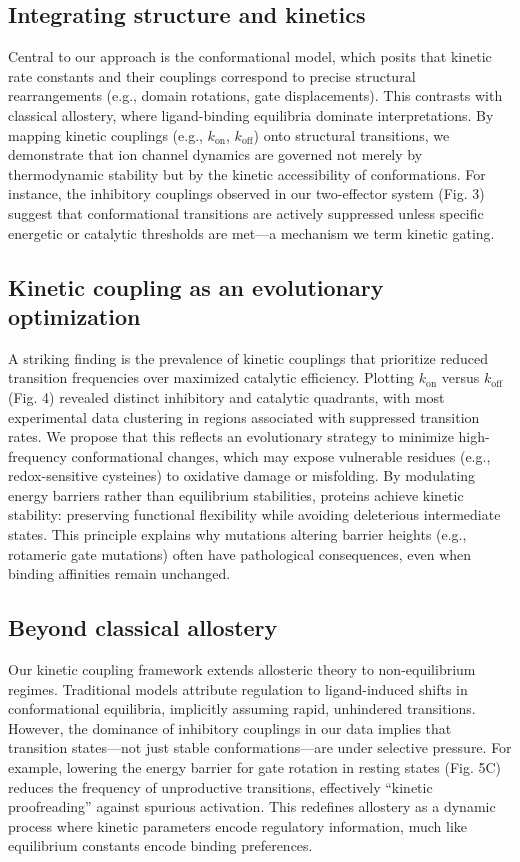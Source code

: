 \documentclass[pdflatex,sn-mathphys-num]{sn-jnl}%
\theoremstyle{thmstyleone}%
\theoremstyle{thmstyletwo}%
\theoremstyle{thmstylethree}%
\begin{document}
\subsection{Integrating structure and kinetics}  
Central to our approach is the conformational model, which posits that kinetic rate constants and their couplings correspond to precise structural rearrangements (e.g., domain rotations, gate displacements). This contrasts with classical allostery, where ligand-binding equilibria dominate interpretations. By mapping kinetic couplings (e.g., \( k_{\text{on}} \), \( k_{\text{off}} \)) onto structural transitions, we demonstrate that ion channel dynamics are governed not merely by thermodynamic stability but by the kinetic accessibility of conformations. For instance, the inhibitory couplings observed in our two-effector system (Fig. 3) suggest that conformational transitions are actively suppressed unless specific energetic or catalytic thresholds are met—a mechanism we term kinetic gating.  


\subsection{Kinetic coupling as an evolutionary optimization} 
A striking finding is the prevalence of kinetic couplings that prioritize reduced transition frequencies over maximized catalytic efficiency. Plotting \( k_{\text{on}} \) versus \( k_{\text{off}} \) (Fig. 4) revealed distinct inhibitory and catalytic quadrants, with most experimental data clustering in regions associated with suppressed transition rates. We propose that this reflects an evolutionary strategy to minimize high-frequency conformational changes, which may expose vulnerable residues (e.g., redox-sensitive cysteines) to oxidative damage or misfolding. By modulating energy barriers rather than equilibrium stabilities, proteins achieve kinetic stability: preserving functional flexibility while avoiding deleterious intermediate states. This principle explains why mutations altering barrier heights (e.g., rotameric gate mutations) often have pathological consequences, even when binding affinities remain unchanged.  



\subsection{Beyond classical allostery}
Our kinetic coupling framework extends allosteric theory to non-equilibrium regimes. Traditional models attribute regulation to ligand-induced shifts in conformational equilibria, implicitly assuming rapid, unhindered transitions. However, the dominance of inhibitory couplings in our data implies that transition states—not just stable conformations—are under selective pressure. For example, lowering the energy barrier for gate rotation in resting states (Fig. 5C) reduces the frequency of unproductive transitions, effectively “kinetic proofreading” against spurious activation. This redefines allostery as a dynamic process where kinetic parameters encode regulatory information, much like equilibrium constants encode binding preferences.  
\end{document}
